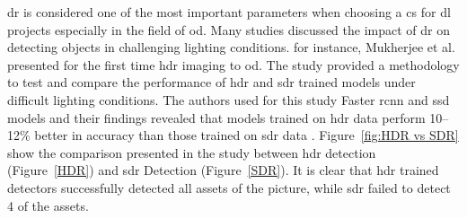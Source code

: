 \gls{dr} is considered one of the most important parameters when choosing a \gls{cs} for \gls{dl} projects especially in the field of \gls{od}. Many studies discussed the impact of \gls{dr} on detecting objects in challenging lighting conditions. for instance, Mukherjee et al. presented for the first time \gls{hdr} imaging to \gls{od}. The study provided a methodology to test and compare the performance of \gls{hdr} and \gls{sdr} trained models under difficult lighting conditions. The authors used for this study Faster \gls{rcnn} and \gls{ssd} models and their findings revealed that models trained on \gls{hdr} data perform 10–12\% better in accuracy than those trained on \gls{sdr} data \cite{HDR}. Figure~\ref{fig:HDR vs SDR} show the comparison presented in the study between \gls{hdr} detection (Figure~\ref{HDR}) and \gls{sdr} Detection (Figure~\ref{SDR}). It is clear that \gls{hdr} trained detectors successfully detected all assets of the picture, while \gls{sdr} failed to detect 4 of the assets.

